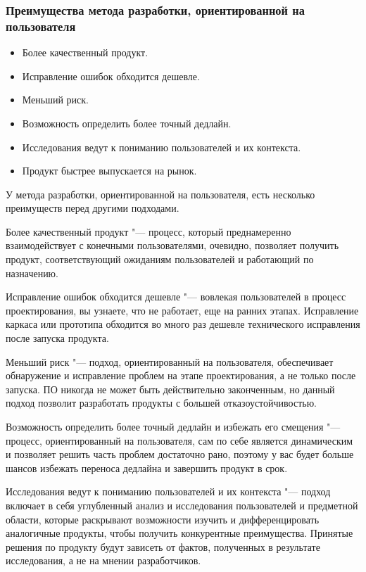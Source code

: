 \documentclass{../industrial-development}
\begin{document}
\begin{frame} \frametitle{Преимущества метода разработки, ориентированной на пользователя}
  \begin{itemize}
   \item Более качественный продукт.
   \item Исправление ошибок обходится дешевле.
   \item Меньший риск.
   \item Возможность определить более точный дедлайн.
   \item Исследования ведут к пониманию пользователей и их контекста.
   \item Продукт быстрее выпускается на рынок.
  \end{itemize}
\end{frame}

\lecturenotes

У метода разработки, ориентированной на пользователя, есть несколько преимуществ перед другими подходами.

Более качественный продукт "--- процесс, который преднамеренно взаимодействует с конечными пользователями, очевидно, позволяет получить продукт, соответствующий ожиданиям пользователей и работающий по назначению.

Исправление ошибок обходится дешевле "--- вовлекая пользователей в процесс проектирования, вы узнаете, что не работает, еще на ранних этапах. Исправление каркаса или прототипа обходится во много раз дешевле технического исправления после запуска продукта.

Меньший риск "--- подход, ориентированный на пользователя, обеспечивает обнаружение и исправление проблем на этапе проектирования, а не только после запуска. ПО никогда не может быть действительно законченным, но данный подход позволит разработать продукты с большей отказоустойчивостью.

Возможность определить более точный дедлайн и избежать его смещения "--- процесс, ориентированный на пользователя, сам по себе является динамическим и позволяет решить часть проблем достаточно рано, поэтому у вас будет больше шансов избежать переноса дедлайна и завершить продукт в срок.

Исследования ведут к пониманию пользователей и их контекста "--- подход включает в себя углубленный анализ и исследования пользователей и предметной области, которые раскрывают возможности изучить и дифференцировать аналогичные продукты, чтобы получить конкурентные преимущества. Принятые решения по продукту будут зависеть от фактов, полученных в результате исследования, а не на мнении разработчиков.
\end{document}

